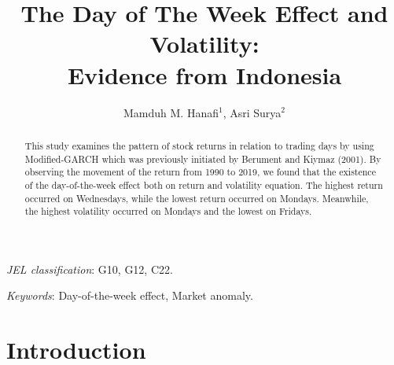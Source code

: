\documentclass[12pt]{article}
\begin{document}

\title{The Day of The Week Effect and Volatility:\\ Evidence from Indonesia }

\author{Mamduh M. Hanafi$^1$, Asri Surya$^2$}

\date{}              %


\renewcommand{\thefootnote}{\fnsymbol{footnote}}

\singlespacing

\maketitle

\vspace{-.2in}
\begin{abstract}
\noindent This study examines the pattern of stock returns in relation to trading days by using Modified-GARCH which was previously initiated by Berument and Kiymaz (2001). By observing the movement of the return from 1990 to 2019, we found that the existence of the day-of-the-week effect both on return and volatility equation. The highest return occurred on Wednesdays, while the lowest return occurred on Mondays. Meanwhile, the highest volatility occurred on Mondays and the lowest on Fridays.

\end{abstract}

\medskip

\noindent \textit{JEL classification}: G10, G12, C22.

\medskip
\noindent \textit{Keywords}: Day-of-the-week effect, Market anomaly.

\thispagestyle{empty}

\clearpage

\doublespacing
\setcounter{footnote}{0}
\renewcommand{\thefootnote}{\arabic{footnote}}
\setcounter{page}{1}


\section*{Introduction}
\end{document}
